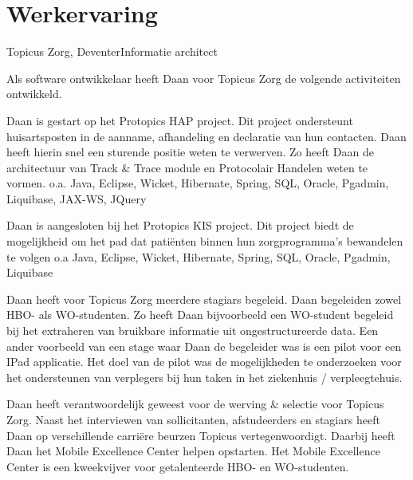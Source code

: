 \section*{Werkervaring}

	\begin{workExperience}{Topicus Zorg, Deventer}{Informatie architect}{}
		
		Als software ontwikkelaar heeft Daan voor Topicus Zorg de volgende
		activiteiten ontwikkeld.
		
		Daan is gestart op het Protopics HAP project. Dit project ondersteunt 
		huisartsposten in de aanname, afhandeling en declaratie van hun 
		contacten. Daan heeft hierin snel een sturende positie weten te 
		verwerven. Zo heeft Daan de architectuur van Track \& Trace module en
		Protocolair Handelen weten te vormen.
		\technics o.a. Java, Eclipse, Wicket, Hibernate, Spring, SQL, Oracle, Pgadmin, Liquibase, JAX-WS, JQuery
		
		Daan is aangesloten bij het Protopics KIS project. Dit project biedt
		de mogelijkheid om het pad dat pati\"enten binnen hun zorgprogramma's
		bewandelen te volgen
		\technics o.a Java, Eclipse, Wicket, Hibernate, Spring, SQL, Oracle, Pgadmin, Liquibase
		
		Daan heeft voor Topicus Zorg meerdere stagiars begeleid. Daan begeleiden
		zowel HBO- als WO-studenten. Zo heeft Daan bijvoorbeeld een WO-student
		begeleid bij het extraheren van bruikbare informatie uit 
		ongestructureerde data. Een ander voorbeeld van een stage waar Daan de 
		begeleider was is een pilot voor een IPad applicatie. Het doel van de
		pilot was de mogelijkheden te onderzoeken voor het ondersteunen van
		verplegers bij hun taken in het ziekenhuis / verpleegtehuis.
		
		Daan heeft verantwoordelijk geweest voor de werving \& selectie voor 
		Topicus Zorg. Naast het interviewen van sollicitanten, afstudeerders en
		stagiars heeft Daan op verschillende carri\"ere beurzen Topicus
		vertegenwoordigt.
		Daarbij heeft Daan het Mobile Excellence Center helpen opstarten. Het
		Mobile Excellence Center is een kweekvijver voor getalenteerde HBO- en
		WO-studenten.
	\end{workExperience}


